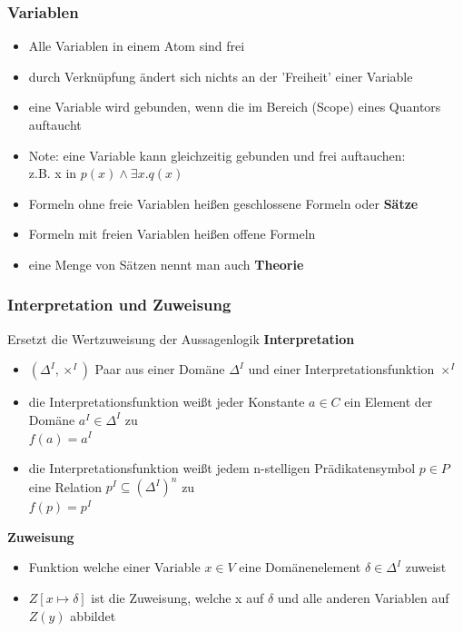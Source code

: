 \documentclass[12pt,a4paper]{article}
\begin{document}
\subsubsection{Variablen}
\begin{itemize}
\item Alle Variablen in einem Atom sind frei
\item durch Verknüpfung ändert sich nichts an der 'Freiheit' einer Variable
\item eine Variable wird gebunden, wenn die im Bereich (Scope) eines Quantors auftaucht
\item Note: eine Variable kann gleichzeitig gebunden und frei auftauchen:\\
z.B. x in $p(x) \land \exists x.q(x)$
\item Formeln ohne freie Variablen heißen geschlossene Formeln oder \textbf{Sätze}
\item Formeln mit freien Variablen heißen offene Formeln
\item eine Menge von Sätzen nennt man auch \textbf{Theorie}
\end{itemize}

\subsubsection{Interpretation und Zuweisung}
Ersetzt die Wertzuweisung der Aussagenlogik
\textbf{Interpretation}
\begin{itemize}
\item $(\Delta^I, \times^I)$ Paar aus einer Domäne $\Delta^I$ und einer Interpretationsfunktion $\times^I$ 
\item die Interpretationsfunktion weißt jeder Konstante $a \in C$ ein Element der Domäne $a^I \in \Delta^I$ zu\\
$f(a) = a^I$
\item die Interpretationsfunktion weißt jedem n-stelligen Prädikatensymbol $p\in P$ eine Relation $p^I \subseteq (\Delta^I)^n$ zu\\
$f(p) = p^I$
\end{itemize}

\textbf{Zuweisung}
\begin{itemize}
\item Funktion welche einer Variable $x \in V$ eine Domänenelement $\delta \in \Delta^I$ zuweist
\item $Z[x \mapsto \delta]$ ist die Zuweisung, welche x auf $\delta$ und alle anderen Variablen auf $Z(y)$ abbildet
\end{itemize}
\end{document}
